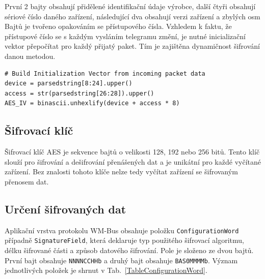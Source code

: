 První 2 bajty obsahují přidělené identifikační údaje výrobce, další čtyři obsahují sériové číslo daného zařízení, následující dva obsahují verzi zařízení a zbylých osm Bajtů je tvořeno opakováním se přístupového čísla. Vzhledem k faktu, že přístupové číslo se s každým vysláním telegramu změní, je nutné inicializační vektor přepočítat pro každý přijatý paket. Tím je zajištěna dynamičnost šifrování danou metodou.

\begin{lstlisting}[caption={Sestavení inicializačního vektoru},captionpos=b,label=CodeIV,style=MyCodePython]
# Build Initialization Vector from incoming packet data
device = parsedstring[8:24].upper()
access = str(parsedstring[26:28]).upper()
AES_IV = binascii.unhexlify(device + access * 8)
\end{lstlisting}


\subsection{Šifrovací klíč}
Šifrovací klíč AES je sekvence bajtů o velikosti 128, 192 nebo 256 bitů. Tento klíč slouží pro šifrování a dešifrování přenášených dat a je unikátní pro každé vyčítané zařízení. Bez znalosti tohoto klíče nelze tedy vyčítat zařízení se šifrovaným přenosem dat.


\subsection{Určení šifrovaných dat}
\label{KapitolaConfigurationWord}
Aplikační vrstva protokolu WM-Bus obsahuje položku \texttt{ConfigurationWord} případně \texttt{SignatureField}, která deklaruje typ použitého šifrovací algoritmu, délku šifrované části a způsob datového šifrování. Pole je složeno ze dvou bajtů. První bajt obsahuje \texttt{NNNNCCHHb} a druhý bajt obsahuje \texttt{BAS0MMMMb}. Význam jednotlivých položek je shrnut v Tab.~\ref{TableConfigurationWord}.


